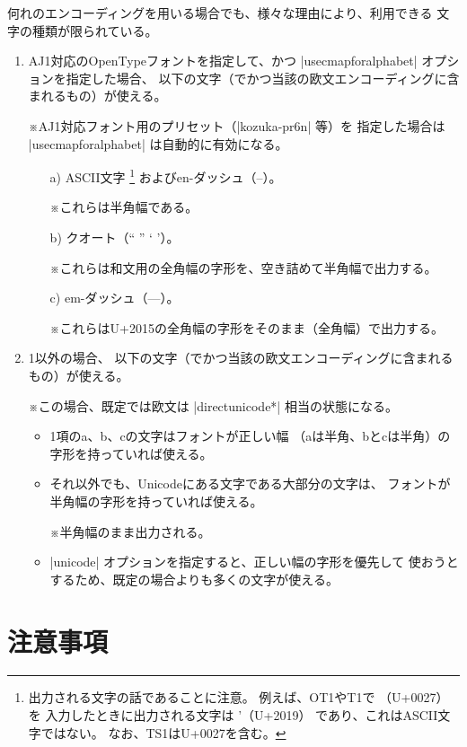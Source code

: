\documentclass[uplatex,dvipdfmx,a4paper]{jsarticle}
\newcommand{\Note}{\par\noindent ※}
\begin{document}
何れのエンコーディングを用いる場合でも、様々な理由により、利用できる
文字の種類が限られている。
\begin{enumerate}
\item AJ1対応のOpenTypeフォントを指定して、かつ |usecmapforalphabet|
  オプションを指定した場合、
  以下の文字（でかつ当該の欧文エンコーディングに含まれるもの）が使える。
  \Note AJ1対応フォント用のプリセット（|kozuka-pr6n| 等）を
  指定した場合は |usecmapforalphabet| は自動的に有効になる。
  \begin{itemize}
  \item[a)] ASCII文字
    \footnote{出力される文字の話であることに注意。
      例えば、OT1やT1で \textsf{\textquotesingle}（U+0027）を
      入力したときに出力される文字は \textsf{\textquoteright}（U+2019）
      であり、これはASCII文字ではない。
      なお、TS1はU+0027を含む。}%
    およびen-ダッシュ（\textsf{--}）。
    \Note これらは半角幅である。
  \item[b)] クオート（\textsf{`` '' ` '}）。
    \Note これらは和文用の全角幅の字形を、空き詰めて半角幅で出力する。
  \item[c)] em-ダッシュ（\textsf{---}）。
    \Note これらはU+2015の全角幅の字形をそのまま（全角幅）で出力する。
  \end{itemize}
\item 1以外の場合、
  以下の文字（でかつ当該の欧文エンコーディングに含まれるもの）が使える。
  \Note この場合、既定では欧文は |directunicode*| 相当の状態になる。
  \begin{itemize}
  \item 1項のa、b、cの文字はフォントが正しい幅
    （aは半角、bとcは半角）の字形を持っていれば使える。
  \item それ以外でも、Unicodeにある文字である大部分の文字は、
    フォントが半角幅の字形を持っていれば使える。
    \Note 半角幅のまま出力される。
  \item |unicode| オプションを指定すると、正しい幅の字形を優先して
    使おうとするため、既定の場合よりも多くの文字が使える。
  \end{itemize}
\end{enumerate}


\section{注意事項}
\label{sec:Notice}
\end{document}
